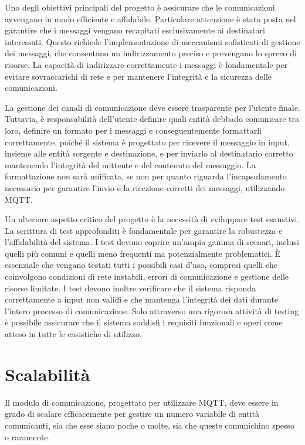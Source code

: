 \documentclass[12pt,a4paper,openright,twoside]{book}
\begin{document}
Uno degli obiettivi principali del progetto è assicurare che le comunicazioni avvengano in modo efficiente e affidabile. Particolare attenzione è stata posta nel garantire 
che i messaggi vengano recapitati esclusivamente ai destinatari interessati. Questo richiede l'implementazione di meccanismi sofisticati di gestione dei messaggi, 
che consentano un indirizzamento preciso e prevengano lo spreco di risorse. La capacità di indirizzare correttamente i messaggi è fondamentale per evitare sovraccarichi 
di rete e per mantenere l'integrità e la sicurezza delle comunicazioni.

La gestione dei canali di comunicazione deve essere trasparente per l'utente finale. Tuttavia, è responsabilità dell'utente definire quali entità debbado comunicare
tra loro, definire un formato per i messaggi e conseguentemente formattarli correttamente, poiché il sistema è progettato per ricevere il messaggio in input, 
insieme alle entità sorgente e destinazione, e per inviarlo al destinatario corretto mantenendo l'integrità del mittente e del contenuto del messaggio. 
La formattazione non sarà unificata, se non per quanto riguarda l'incapsulamento necessario per garantire l'invio e la ricezione corretti dei messaggi, utilizzando \ac{MQTT}.

Un ulteriore aspetto critico del progetto è la necessità di sviluppare test esaustivi. La scrittura di test approfonditi è fondamentale per garantire la robustezza 
e l'affidabilità del sistema. I test devono coprire un'ampia gamma di scenari, inclusi quelli più comuni e quelli meno frequenti ma potenzialmente problematici. 
È essenziale che vengano testati tutti i possibili casi d'uso, compresi quelli che coinvolgono condizioni di rete instabili, errori di comunicazione e gestione 
delle risorse limitate. I test devono inoltre verificare che il sistema risponda correttamente a input non validi e che mantenga l'integrità dei dati durante 
l'intero processo di comunicazione. Solo attraverso una rigorosa attività di testing è possibile assicurare che il sistema soddisfi i requisiti funzionali e 
operi come atteso in tutte le casistiche di utilizzo.

\section{Scalabilità}

Il modulo di comunicazione, progettato per utilizzare \ac{MQTT}, deve essere in grado di scalare efficacemente per gestire un numero variabile 
di entità comunicanti, sia che esse siano poche o molte, sia che queste comunichino spesso o raramente.
\end{document}
